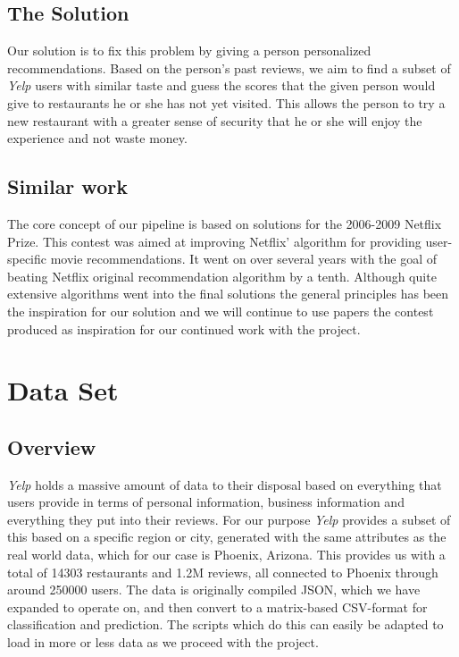 \documentclass[10pt,twocolumn,letterpaper]{article}
\begin{document}
\subsection{The Solution}
Our solution is to fix this problem by giving a person personalized recommendations. Based on the person's past reviews, we aim to find a subset of \textit{Yelp} users with similar taste and guess the scores that the given person would give to restaurants he or she has not yet visited. This allows the person to try a new restaurant with a greater sense of security that he or she will enjoy the experience and not waste money.
\subsection{Similar work}
The core concept of our pipeline is based on solutions for the 2006-2009 Netflix Prize. This contest was aimed at improving Netflix' algorithm for providing user-specific movie recommendations. It went on over several years with the goal of beating Netflix original recommendation algorithm by a tenth. Although quite extensive algorithms went into the final solutions the general principles has been the inspiration for our solution and we will continue to use papers the contest produced as inspiration for our continued work with the project\cite{KorBell}\cite{BellKor}.

\section{Data Set}
\subsection{Overview}
\textit{Yelp} holds a massive amount of data to their disposal based on everything that users provide in terms of personal information, business information and everything they put into their reviews. For our purpose \textit{Yelp} provides a subset of this based on a specific region or city, generated with the same attributes as the real world data, which for our case is Phoenix, Arizona. This provides us with a total of 14303 restaurants and 1.2M reviews, all connected to Phoenix through around 250000 users. The data is originally compiled JSON, which we have expanded to operate on, and then convert to a matrix-based CSV-format for classification and prediction. The scripts which do this can easily be adapted to load in more or less data as we proceed with the project.
\end{document}
